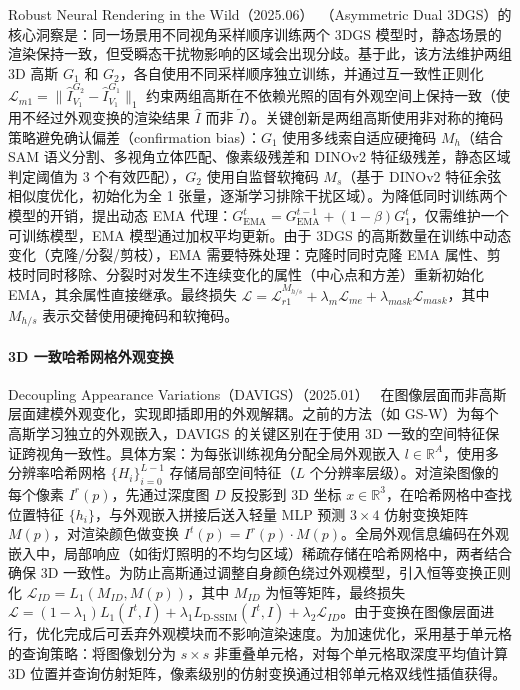 Robust Neural Rendering in the Wild（2025.06）~\cite{2506_03538}（Asymmetric Dual 3DGS）的核心洞察是：同一场景用不同视角采样顺序训练两个 3DGS 模型时，静态场景的渲染保持一致，但受瞬态干扰物影响的区域会出现分歧。基于此，该方法维护两组 3D 高斯 $G_1$ 和 $G_2$，各自使用不同采样顺序独立训练，并通过互一致性正则化 $\mathcal{L}_{m1} = \|\hat{I}^{G_2}_{V_1} - \hat{I}^{G_1}_{V_1}\|_1$ 约束两组高斯在不依赖光照的固有外观空间上保持一致（使用不经过外观变换的渲染结果 $\hat{I}$ 而非 $\tilde{I}$）。关键创新是两组高斯使用非对称的掩码策略避免确认偏差（confirmation bias）：$G_1$ 使用多线索自适应硬掩码 $M_h$（结合 SAM 语义分割、多视角立体匹配、像素级残差和 DINOv2 特征级残差，静态区域判定阈值为 3 个有效匹配），$G_2$ 使用自监督软掩码 $M_s$（基于 DINOv2 特征余弦相似度优化，初始化为全 1 张量，逐渐学习排除干扰区域）。为降低同时训练两个模型的开销，提出动态 EMA 代理：$G_{\text{EMA}}^t = G_{\text{EMA}}^{t-1} + (1-\beta) G_1^t$，仅需维护一个可训练模型，EMA 模型通过加权平均更新。由于 3DGS 的高斯数量在训练中动态变化（克隆/分裂/剪枝），EMA 需要特殊处理：克隆时同时克隆 EMA 属性、剪枝时同时移除、分裂时对发生不连续变化的属性（中心点和方差）重新初始化 EMA，其余属性直接继承。最终损失 $\mathcal{L} = \mathcal{L}_{r1}^{M_{h/s}} + \lambda_m \mathcal{L}_{me} + \lambda_{mask} \mathcal{L}_{mask}$，其中 $M_{h/s}$ 表示交替使用硬掩码和软掩码。

\paragraph{3D 一致哈希网格外观变换}

Decoupling Appearance Variations（DAVIGS）（2025.01）~\cite{2501_10788} 在图像层面而非高斯层面建模外观变化，实现即插即用的外观解耦。之前的方法（如 GS-W）为每个高斯学习独立的外观嵌入，DAVIGS 的关键区别在于使用 3D 一致的空间特征保证跨视角一致性。具体方案：为每张训练视角分配全局外观嵌入 $l \in \mathbb{R}^A$，使用多分辨率哈希网格 $\{H_i\}_{i=0}^{L-1}$ 存储局部空间特征（$L$ 个分辨率层级）。对渲染图像的每个像素 $I^r(p)$，先通过深度图 $D$ 反投影到 3D 坐标 $x \in \mathbb{R}^3$，在哈希网格中查找位置特征 $\{h_i\}$，与外观嵌入拼接后送入轻量 MLP 预测 $3 \times 4$ 仿射变换矩阵 $M(p)$，对渲染颜色做变换 $I^t(p) = I^r(p) \cdot M(p)$。全局外观信息编码在外观嵌入中，局部响应（如街灯照明的不均匀区域）稀疏存储在哈希网格中，两者结合确保 3D 一致性。为防止高斯通过调整自身颜色绕过外观模型，引入恒等变换正则化 $\mathcal{L}_{ID} = L_1(M_{ID}, M(p))$，其中 $M_{ID}$ 为恒等矩阵，最终损失 $\mathcal{L} = (1-\lambda_1)L_1(I^t, I) + \lambda_1 L_{\text{D-SSIM}}(I^t, I) + \lambda_2 \mathcal{L}_{ID}$。由于变换在图像层面进行，优化完成后可丢弃外观模块而不影响渲染速度。为加速优化，采用基于单元格的查询策略：将图像划分为 $s \times s$ 非重叠单元格，对每个单元格取深度平均值计算 3D 位置并查询仿射矩阵，像素级别的仿射变换通过相邻单元格双线性插值获得。

